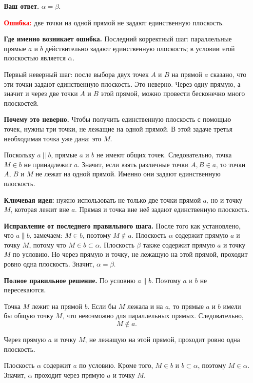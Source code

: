 \documentclass[12pt,a4paper]{article}
\begin{document}
\textbf{Ваш ответ.}
$\alpha=\beta$.

\textcolor{red}{\textbf{Ошибка:}} две точки на одной прямой не задают единственную плоскость.

\textbf{Где именно возникает ошибка.}
Последний корректный шаг: параллельные прямые $a$ и $b$ действительно задают единственную плоскость; в условии этой плоскостью является $\alpha$.

Первый неверный шаг: после выбора двух точек $A$ и $B$ на прямой $a$ сказано, что эти точки задают единственную плоскость. Это неверно. Через одну прямую, а значит и через две точки $A$ и $B$ этой прямой, можно провести бесконечно много плоскостей.

\textbf{Почему это неверно.}
Чтобы получить единственную плоскость с помощью точек, нужны три точки, не лежащие на одной прямой. В этой задаче третья необходимая точка уже дана: это $M$.

Поскольку $a\parallel b$, прямые $a$ и $b$ не имеют общих точек. Следовательно, точка $M\in b$ не принадлежит $a$. Значит, если взять различные точки $A,B\in a$, то точки $A$, $B$ и $M$ не лежат на одной прямой. Именно они задают единственную плоскость.

\textcolor{blue!60!black}{\textbf{Ключевая идея:}} нужно использовать не только две точки прямой $a$, но и точку $M$, которая лежит вне $a$. Прямая и точка вне неё задают единственную плоскость.

\textbf{Исправление от последнего правильного шага.}
После того как установлено, что $a\parallel b$, замечаем: $M\in b$, поэтому $M\notin a$. Плоскость $\alpha$ содержит прямую $a$ и точку $M$, потому что $M\in b\subset\alpha$. Плоскость $\beta$ также содержит прямую $a$ и точку $M$ по условию. Но через прямую и точку, не лежащую на этой прямой, проходит ровно одна плоскость. Значит, $\alpha=\beta$.

\textbf{Полное правильное решение.}
По условию $a\parallel b$. Поэтому $a$ и $b$ не пересекаются.

Точка $M$ лежит на прямой $b$. Если бы $M$ лежала и на $a$, то прямые $a$ и $b$ имели бы общую точку $M$, что невозможно для параллельных прямых. Следовательно,
\[
M\notin a.
\]

Через прямую $a$ и точку $M$, не лежащую на этой прямой, проходит ровно одна плоскость.

Плоскость $\alpha$ содержит $a$ по условию. Кроме того, $M\in b$ и $b\subset\alpha$, поэтому $M\in\alpha$. Значит, $\alpha$ проходит через прямую $a$ и точку $M$.
\end{document}
